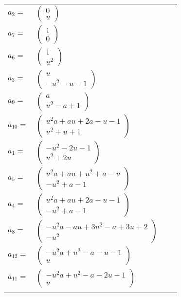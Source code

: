 \documentclass[1p]{elsarticle_modified}
\theoremstyle{definition}
\begin{document}
\begin{tabular}{m{7pt} m{180pt} m{7pt} m{180pt} }
\flushright $a_{2}=$&$\begin{pmatrix}0\\u\end{pmatrix}$ \\
\flushright $a_{7}=$&$\begin{pmatrix}1\\0\end{pmatrix}$ \\
\flushright $a_{6}=$&$\begin{pmatrix}1\\u^2\end{pmatrix}$ \\
\flushright $a_{3}=$&$\begin{pmatrix}u\\- u^2- u-1\end{pmatrix}$ \\
\flushright $a_{9}=$&$\begin{pmatrix}a\\u^2- a+1\end{pmatrix}$ \\
\flushright $a_{10}=$&$\begin{pmatrix}u^2 a+a u+2 a- u-1\\u^2+u+1\end{pmatrix}$ \\
\flushright $a_{1}=$&$\begin{pmatrix}- u^2-2 u-1\\u^2+2 u\end{pmatrix}$ \\
\flushright $a_{5}=$&$\begin{pmatrix}u^2 a+a u+u^2+a- u\\- u^2+a-1\end{pmatrix}$ \\
\flushright $a_{4}=$&$\begin{pmatrix}u^2 a+a u+2 a- u-1\\- u^2+a-1\end{pmatrix}$ \\
\flushright $a_{8}=$&$\begin{pmatrix}- u^2 a- a u+3 u^2- a+3 u+2\\- u^2\end{pmatrix}$ \\
\flushright $a_{12}=$&$\begin{pmatrix}- u^2 a+u^2- a- u-1\\u\end{pmatrix}$ \\
\flushright $a_{11}=$&$\begin{pmatrix}- u^2 a+u^2- a-2 u-1\\u\end{pmatrix}$\\&\end{tabular}
\end{document}
